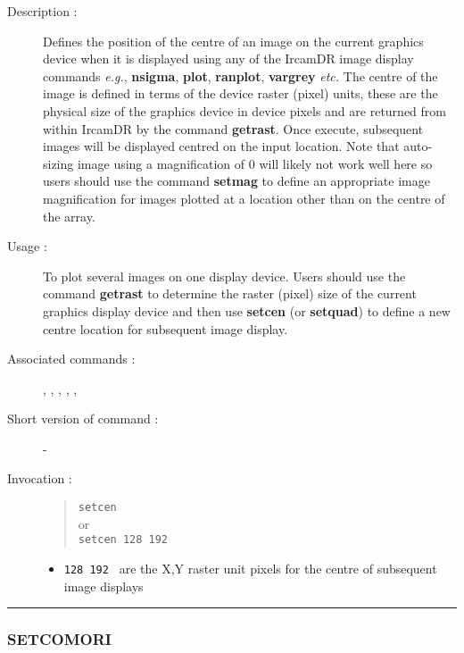 \begin{description}

\item[Description :] Defines the position of the centre of an image on
the current graphics device when it is displayed using any of the {\sc
IrcamDR} image display commands \emph{e.g.}, {\bf nsigma}, {\bf plot},
{\bf ranplot}, {\bf vargrey} \emph{etc.}  The centre of the image is
defined in terms of the device raster (pixel) units, these are the
physical size of the graphics device in device pixels and are returned
from within {\sc IrcamDR} by the command {\bf getrast}.  Once execute,
subsequent images will be displayed centred on the input location.
Note that auto-sizing image using a magnification of 0 will likely not
work well here so users should use the command {\bf setmag} to define
an appropriate image magnification for images plotted at a location
other than on the centre of the array.

\item[Usage :] To plot several images on one display device.
Users should use the command {\bf getrast} to determine the raster (pixel)
size of the current graphics display device and then use {\bf setcen} (or
{\bf setquad}) to define a new centre location for subsequent image display.

\item[Associated commands :] {\tt {}}, 
{\tt {}}, {\tt {}}, 
{\tt {}}, {\tt {}}, 
{\tt {}}

\item[Short version of command :] -
\item[Invocation :]

\begin{quote}{\tt  setcen }\\
or \\
{\tt setcen 128 192 }
\end{quote}

\begin{itemize}

\item {\tt 128 192 } are the X,Y raster unit pixels for the centre of
 subsequent image displays
\end{itemize}

\end{description}

\hrule 
\subsubsection*{\label{SETCOMORI}SETCOMORI}

